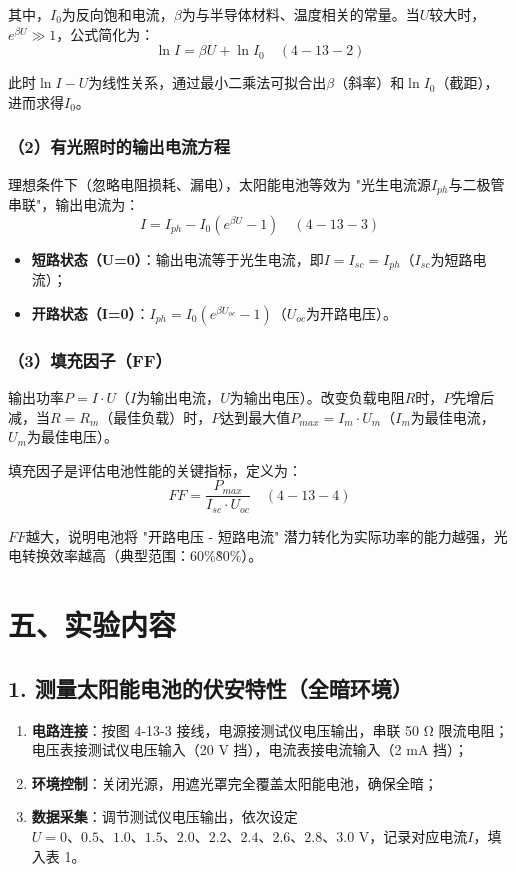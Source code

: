 \documentclass[12pt]{article}
\begin{document}
其中，$I_0$为反向饱和电流，$\beta$为与半导体材料、温度相关的常量。当$U$较大时，$e^{\beta U} \gg 1$，公式简化为：
\begin{equation}
\ln I = \beta U + \ln I_0 \quad (4-13-2)
\end{equation}

此时$\ln I-U$为线性关系，通过最小二乘法可拟合出$\beta$（斜率）和$\ln I_0$（截距），进而求得$I_0$。

\subsubsection{（2）有光照时的输出电流方程}
理想条件下（忽略电阻损耗、漏电），太阳能电池等效为 "光生电流源$I_{ph}$与二极管串联"，输出电流为：
\begin{equation}
I = I_{ph} - I_0 \left( e^{\beta U} - 1 \right) \quad (4-13-3)
\end{equation}

\begin{itemize}
  \item \textbf{短路状态（U=0）}：输出电流等于光生电流，即$I = I_{sc} = I_{ph}$（$I_{sc}$为短路电流）；
  \item \textbf{开路状态（I=0）}：$I_{ph} = I_0 \left( e^{\beta U_{oc}} - 1 \right)$（$U_{oc}$为开路电压）。
\end{itemize}

\subsubsection{（3）填充因子（FF）}
输出功率$P = I \cdot U$（$I$为输出电流，$U$为输出电压）。改变负载电阻$R$时，$P$先增后减，当$R=R_m$（最佳负载）时，$P$达到最大值$P_{max} = I_m \cdot U_m$（$I_m$为最佳电流，$U_m$为最佳电压）。

填充因子是评估电池性能的关键指标，定义为：
\begin{equation}
FF = \frac{P_{max}}{I_{sc} \cdot U_{oc}} \quad (4-13-4)
\end{equation}

$FF$越大，说明电池将 "开路电压 - 短路电流" 潜力转化为实际功率的能力越强，光电转换效率越高（典型范围：60\%\~80\%）。

\section{五、实验内容}
\subsection{1. 测量太阳能电池的伏安特性（全暗环境）}
\begin{enumerate}
  \item \textbf{电路连接}：按图 4-13-3 接线，电源接测试仪电压输出，串联 50 Ω 限流电阻；电压表接测试仪电压输入（20 V 挡），电流表接电流输入（2 mA 挡）；
  \item \textbf{环境控制}：关闭光源，用遮光罩完全覆盖太阳能电池，确保全暗；
  \item \textbf{数据采集}：调节测试仪电压输出，依次设定$U=0、0.5、1.0、1.5、2.0、2.2、2.4、2.6、2.8、3.0$ V，记录对应电流$I$，填入表 1。
\end{enumerate}
\end{document}
